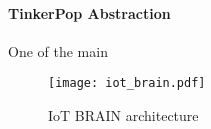 \paragraph{TinkerPop Abstraction}
One of the main 



\begin{figure}
  \centering
  \texttt{[image: iot\_brain.pdf]}
  \caption{IoT BRAIN architecture}
  \label{fig:iot_brain}
\end{figure}

